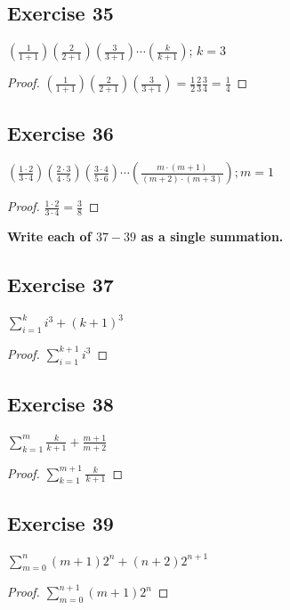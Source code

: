 \documentclass[14pt]{extarticle}
\newcommand{\dps}{\displaystyle}
\newcommand{\cy}{\color{cyan}}
\begin{document}
\subsection{Exercise 35}
$\dps \left(\frac{1}{1+1}\right)\left(\frac{2}{2+1}\right)\left(\frac{3}{3+1}\right) \cdots \left(\frac{k}{k+1}\right)$; $k = 3$

\begin{proof}
$\dps \left(\frac{1}{1+1}\right)\left(\frac{2}{2+1}\right)\left(\frac{3}{3+1}\right) = \frac{1}{2}\frac{2}{3}\frac{3}{4} = \frac{1}{4}$
\end{proof}

\subsection{Exercise 36}
$\dps \left(\frac{1\cdot2}{3\cdot4}\right)\left(\frac{2\cdot3}{4\cdot5}\right)\left(\frac{3\cdot4}{5\cdot6}\right)\cdots\left(\frac{m\cdot(m+1)}{(m+2)\cdot(m+3)}\right); m = 1$

\begin{proof}
$\dps \frac{1\cdot2}{3\cdot4} = \frac{3}{8}$
\end{proof}

{\bf\cy Write each of $37-39$ as a single summation.}

\subsection{Exercise 37}
$\dps\sum_{i=1}^{k}i^3 + (k+1)^3$

\begin{proof}
$\dps\sum_{i=1}^{k+1}i^3$
\end{proof}

\subsection{Exercise 38}
$\dps\sum_{k=1}^{m}\frac{k}{k+1} + \frac{m+1}{m+2}$

\begin{proof}
$\dps\sum_{k=1}^{m+1}\frac{k}{k+1}$
\end{proof}

\subsection{Exercise 39}
$\dps\sum_{m=0}^{n}(m+1)2^n + (n+2)2^{n+1}$

\begin{proof}
$\dps\sum_{m=0}^{n+1}(m+1)2^n$
\end{proof}
\end{document}
